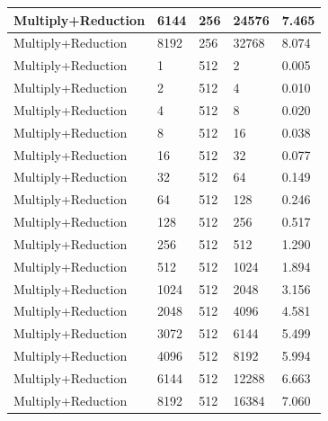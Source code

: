 \documentclass{article}
\begin{document}
\begin{longtable}{|l|l|l|l|l|}
Multiply+Reduction & 6144 & 256         & 24576             & 7.465             \\ \hline
Multiply+Reduction & 8192 & 256         & 32768             & 8.074             \\ \hline
Multiply+Reduction & 1    & 512         & 2                 & 0.005             \\ \hline
Multiply+Reduction & 2    & 512         & 4                 & 0.010             \\ \hline
Multiply+Reduction & 4    & 512         & 8                 & 0.020             \\ \hline
Multiply+Reduction & 8    & 512         & 16                & 0.038             \\ \hline
Multiply+Reduction & 16   & 512         & 32                & 0.077             \\ \hline
Multiply+Reduction & 32   & 512         & 64                & 0.149             \\ \hline
Multiply+Reduction & 64   & 512         & 128               & 0.246             \\ \hline
Multiply+Reduction & 128  & 512         & 256               & 0.517             \\ \hline
Multiply+Reduction & 256  & 512         & 512               & 1.290             \\ \hline
Multiply+Reduction & 512  & 512         & 1024              & 1.894             \\ \hline
Multiply+Reduction & 1024 & 512         & 2048              & 3.156             \\ \hline
Multiply+Reduction & 2048 & 512         & 4096              & 4.581             \\ \hline
Multiply+Reduction & 3072 & 512         & 6144              & 5.499             \\ \hline
Multiply+Reduction & 4096 & 512         & 8192              & 5.994             \\ \hline
Multiply+Reduction & 6144 & 512         & 12288             & 6.663             \\ \hline
Multiply+Reduction & 8192 & 512         & 16384             & 7.060             \\ \hline
\end{longtable}
\end{document}
